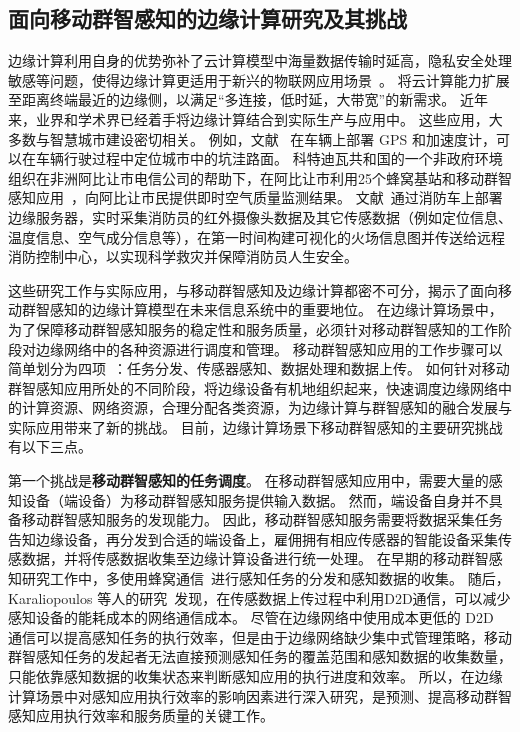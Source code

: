 \subsection{面向移动群智感知的边缘计算研究及其挑战}

边缘计算利用自身的优势弥补了云计算模型中海量数据传输时延高，隐私安全处理敏感等问题，使得边缘计算更适用于新兴的物联网应用场景~\cite{DBLP:journals/cm/SunA16}。
将云计算能力扩展至距离终端最近的边缘侧，以满足“多连接，低时延，大带宽”的新需求。
近年来，业界和学术界已经着手将边缘计算结合到实际生产与应用中。
这些应用，大多数与智慧城市建设密切相关。
例如，文献~ 在车辆上部署 GPS 和加速度计，可以在车辆行驶过程中定位城市中的坑洼路面。
科特迪瓦共和国的一个非政府环境组织在非洲阿比让市电信公司的帮助下，在阿比让市利用25个蜂窝基站和移动群智感知应用~\cite{DBLP:conf/huc/ZhangXWC14}，向阿比让市民提供即时空气质量监测结果。
文献~通过消防车上部署边缘服务器，实时采集消防员的红外摄像头数据及其它传感数据（例如定位信息、温度信息、空气成分信息等），在第一时间构建可视化的火场信息图并传送给远程消防控制中心，以实现科学救灾并保障消防员人生安全。

这些研究工作与实际应用，与移动群智感知及边缘计算都密不可分，揭示了面向移动群智感知的边缘计算模型在未来信息系统中的重要地位。
在边缘计算场景中，为了保障移动群智感知服务的稳定性和服务质量，必须针对移动群智感知的工作阶段对边缘网络中的各种资源进行调度和管理。
移动群智感知应用的工作步骤可以简单划分为四项~\cite{zh_cn:shi}：任务分发、传感器感知、数据处理和数据上传。
如何针对移动群智感知应用所处的不同阶段，将边缘设备有机地组织起来，快速调度边缘网络中的计算资源、网络资源，合理分配各类资源，为边缘计算与群智感知的融合发展与实际应用带来了新的挑战。
目前，边缘计算场景下移动群智感知的主要研究挑战有以下三点。

第一个挑战是\textbf{移动群智感知的任务调度}。
在移动群智感知应用中，需要大量的感知设备（端设备）为移动群智感知服务提供输入数据。
然而，端设备自身并不具备移动群智感知服务的发现能力。
因此，移动群智感知服务需要将数据采集任务告知边缘设备，再分发到合适的端设备上，雇佣拥有相应传感器的智能设备采集传感数据，并将传感数据收集至边缘计算设备进行统一处理。
在早期的移动群智感知研究工作中，多使用蜂窝通信~\cite{DBLP:conf/globecom/ZhangJLLC16,DBLP:conf/icdcs/XiaoWHHH16}进行感知任务的分发和感知数据的收集。
随后，Karaliopoulos 等人的研究~\cite{DBLP:conf/infocom/KaraliopoulosTK15}发现，在传感数据上传过程中利用D2D通信，可以减少感知设备的能耗成本的网络通信成本。
尽管在边缘网络中使用成本更低的 D2D 通信可以提高感知任务的执行效率，但是由于边缘网络缺少集中式管理策略，移动群智感知任务的发起者无法直接预测感知任务的覆盖范围和感知数据的收集数量，只能依靠感知数据的收集状态来判断感知应用的执行进度和效率。
所以，在边缘计算场景中对感知应用执行效率的影响因素进行深入研究，是预测、提高移动群智感知应用执行效率和服务质量的关键工作。


